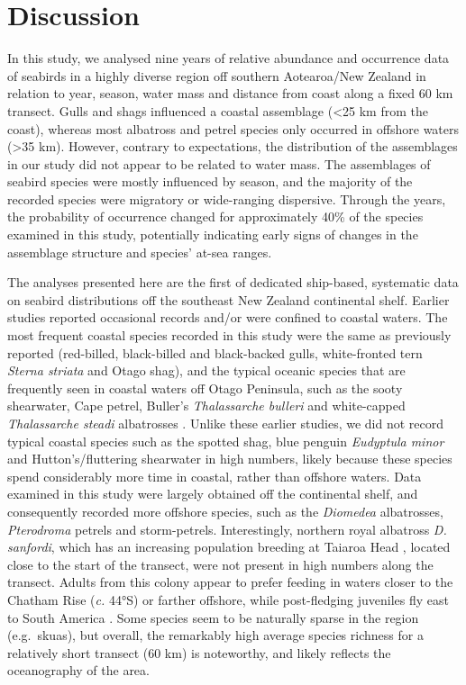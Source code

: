 \documentclass[preprint, 3p, authoryear]{elsarticle} %
\begin{document}
\hypertarget{discussion}{%
\section{Discussion}\label{discussion}}

In this study, we analysed nine years of relative abundance and occurrence data of seabirds in a highly diverse region off southern Aotearoa/New Zealand in relation to year, season, water mass and distance from coast along a fixed 60 km transect. Gulls and shags influenced a coastal assemblage (\textless25 km from the coast), whereas most albatross and petrel species only occurred in offshore waters (\textgreater35 km). However, contrary to expectations, the distribution of the assemblages in our study did not appear to be related to water mass. The assemblages of seabird species were mostly influenced by season, and the majority of the recorded species were migratory or wide-ranging dispersive. Through the years, the probability of occurrence changed for approximately 40\% of the species examined in this study, potentially indicating early signs of changes in the assemblage structure and species' at-sea ranges.

The analyses presented here are the first of dedicated ship-based, systematic data on seabird distributions off the southeast New Zealand continental shelf. Earlier studies reported occasional records \citep[e.g.][]{hicks1973, jenkins1984} and/or were confined to coastal waters. The most frequent coastal species recorded in this study were the same as previously reported (red-billed, black-billed and black-backed gulls, white-fronted tern \emph{Sterna striata} and Otago shag), and the typical oceanic species that are frequently seen in coastal waters off Otago Peninsula, such as the sooty shearwater, Cape petrel, Buller's \emph{Thalassarche bulleri} and white-capped \emph{Thalassarche steadi} albatrosses \citep{mcclatchie1989, hawke1991, odriscoll1998a, odriscoll1998b, bourke2024}. Unlike these earlier studies, we did not record typical coastal species such as the spotted shag, blue penguin \emph{Eudyptula minor} and Hutton's/fluttering shearwater in high numbers, likely because these species spend considerably more time in coastal, rather than offshore waters. Data examined in this study were largely obtained off the continental shelf, and consequently recorded more offshore species, such as the \emph{Diomedea} albatrosses, \emph{Pterodroma} petrels and storm-petrels. Interestingly, northern royal albatross \emph{D. sanfordi}, which has an increasing population breeding at Taiaroa Head \citep{richard2015}, located close to the start of the transect, were not present in high numbers along the transect. Adults from this colony appear to prefer feeding in waters closer to the Chatham Rise (\emph{c.} 44°S) or farther offshore, while post-fledging juveniles fly east to South America \citep{nicholls1994, thomas2010}. Some species seem to be naturally sparse in the region (e.g.~skuas), but overall, the remarkably high average species richness for a relatively short transect (60 km) is noteworthy, and likely reflects the oceanography of the area.
\end{document}
